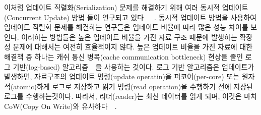 이처럼 업데이트 직렬화(Serialization) 문제를 해결하기 위해 여러 동시적 업데이트(Concurrent Update)
 방법 들이 연구되고
 있다~\cite{Arbel2014ConcurrentRCU}~\cite{Matveev2015RLU}~\cite{Dodds2015SCT}.
동시적 업데이트 방법을 사용하여 업데이트 직렬화 문제를 해결하는 연구들은 
업데이트 비율에 따라 많은 성능 차이를 보인다.
이러하는 방법들은 높은 업데이트 비율을 가진 자료 구조 때문에 발생하는 확장성 문제에 
대해서는 여전히 효율적이지 않다.  
높은 업데이트 비율을 가진 자료에 대한 해결책 중 하나는 캐쉬 통신 병목(cache communication bottleneck)
현상을 줄인 로그 기반(log-based) 알고리즘~\cite{Hendler2010FC}~\cite{SilasBoydWickizerPth}을
사용하는 것이다.
로그 기반 알고리즘은 업데이트가 발생하면, 자료구조의 업데이트 명령(update operatin)을
퍼코어(per-core) 또는 원자적(atomic)하게 로그로 저장하고 읽기 명령(read operation)을 수행하기
 전에 저장된 로그를 수행하는것이다.
따라서, 리더(reader)는 최신 데이터를 읽게 되며, 이것은 마치 CoW(Copy On Write)와
유사하다~\cite{PaulDetailLWN}~\cite{Morrison2016SSM}.

